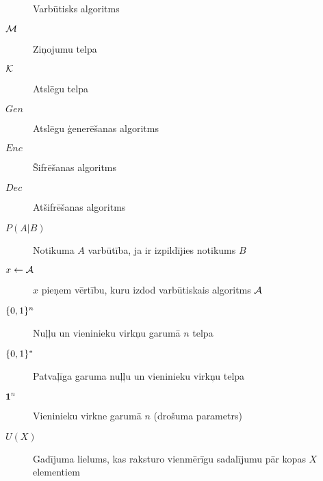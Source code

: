 \begin{description}
    \item[\ppt] Varbūtisks algoritms
    \item[$\mathcal{M}$]Ziņojumu telpa
    \item[$\mathcal{K}$]Atslēgu telpa
    \item[$Gen$]Atslēgu ģenerēšanas algoritms
    \item[$Enc$]Šifrēšanas algoritms
    \item[$Dec$]Atšifrēšanas algoritms
    \item[$P(A|B)$]Notikuma $A$ varbūtība, ja ir izpildījies notikums $B$
    \item[$x \leftarrow \mathcal{A}$]$x$ pieņem vērtību, kuru izdod varbūtiskais algoritms $\mathcal{A}$
    \item[$\{0,1\}^n$]Nuļļu un vieninieku virkņu garumā $n$ telpa
    \item[$\{0,1\}^*$]Patvaļīga garuma nuļļu un vieninieku virkņu telpa
    \item[$\mathbf{1}^n$]Vieninieku virkne garumā $n$ (drošuma parametrs)
    \item[$U(X)$] Gadījuma lielums, kas raksturo vienmērīgu sadalījumu pār kopas $X$ elementiem
\end{description}

